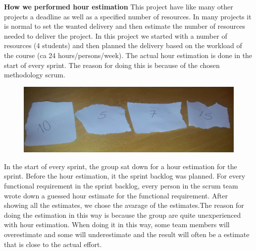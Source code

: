 	{\bf How we performed hour estimation} This project have like many other projects a deadline
	as well as a specified number of resources. In many projects it is normal to set the wanted 
	delivery and then estimate the number of resources needed to deliver the project.
	In this project we started with a number of resources (4 students) and then planned the 
	delivery based on the workload of the course (ca 24 hours/persons/week). The actual 
	hour estimation is done in the start of every sprint. The reason for doing this is because of 
	the chosen methodology scrum.

	\begin{figure}[H]
		\includegraphics[width=1.0\textwidth]{pictures/estimation.jpg}
	\end{figure}

	In the start of every sprint, the group sat down for a hour estimation for the sprint.
	Before the hour estimation, it the sprint backlog was planned. For every functional requirement
	in the sprint backlog, every person in the scrum team wrote down a guessed hour estimate
	for the functional requirement. After showing all the estimates, we chose the avarage of
	the estimates.The reason for doing the estimation in this way is because the group 
	are quite unexperienced with hour estimation. When doing it in this way, some team 
	members will overestimate and some will underestimate and the result will often be a estimate that is close to the actual effort. 
